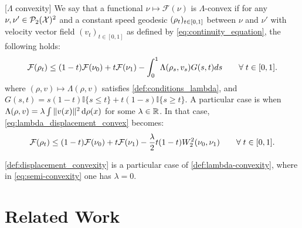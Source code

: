 \begin{definition}\label{def:lambda-convexity}[$\Lambda$ convexity]
	We say that a functional $\nu\mapsto\mathcal{F}(\nu)$ is $\Lambda$-convex
	if for any $\nu,\nu'\in \mathcal{P}_2({{\mathcal X}})^2$ and a constant speed geodesic $(\text{\ensuremath{\rho_{t}}})_{t \in [0,1]}$
	between $\nu$ and $\nu'$ with velocity vector field $(v_{t})_{t \in [0,1]}$ as defined by \cref{eq:continuity_equation},
	the following holds:
	\begin{equation}\label{eq:lambda_displacement_convex}
		{{\mathcal F}}(\rho_{t})\leq(1-t){{\mathcal F}}(\nu_{0})+t{{\mathcal F}}(\nu_{1})-\int_{0}^{1}\Lambda(\rho_{s},v_{s})G(s,t)ds \qquad\forall\; t\in[0,1].
	\end{equation}
	where $(\rho,v)\mapsto\Lambda(\rho,v)$ satisfies \cref{def:conditions_lambda},
	and $G(s,t)=s(1-t) \mathbb{I}\{s\leq t\}
	+t(1-s) \mathbb{I}\{s\geq t\}$.
	A particular case is when $\Lambda(\rho,v)= \lambda \int \Vert v(x) \Vert^2 \mathop{}\!\mathrm{d} \rho(x)   $ for some $\lambda\in {{\mathbb R}}$. In that case, \cref{eq:lambda_displacement_convex} becomes:
\begin{align}\label{eq:semi-convexity}
	{{\mathcal F}}(\rho_{t})\leq(1-t){{\mathcal F}}(\nu_{0})+t{{\mathcal F}}(\nu_{1})-\frac{\lambda}{2}t(1-t)W_2^2(\nu_0,\nu_1)  \qquad\forall\; t\in[0,1].
\end{align}
\end{definition}
\cref{def:displacement_convexity} is a particular case of \cref{def:lambda-convexity}, where in \cref{eq:semi-convexity} one has $\lambda =0$.

\section{Related Work}
